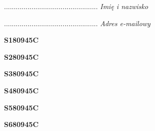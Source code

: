 \begin{turn}{90}\begin{minipage}{\linewidth} \vspace{20mm} ................................................  \textit{Imię i nazwisko}\end{minipage}\end{turn}

\begin{turn}{90}\begin{minipage}{\linewidth} \vspace{20mm} ................................................  \textit{Adres e-mailowy}\end{minipage}\end{turn}

\begin{turn}{90}\huge \begin{minipage}{\linewidth} \vspace{10mm}\textbf{S180945C}\end{minipage}\end{turn}

\begin{turn}{90}\huge \begin{minipage}{\linewidth} \vspace{10mm}\textbf{S280945C}\end{minipage}\end{turn}

\begin{turn}{90}\huge \begin{minipage}{\linewidth} \vspace{10mm}\textbf{S380945C}\end{minipage}\end{turn}

\begin{turn}{90}\huge \begin{minipage}{\linewidth} \vspace{10mm}\textbf{S480945C}\end{minipage}\end{turn}

\begin{turn}{90}\huge \begin{minipage}{\linewidth} \vspace{10mm}\textbf{S580945C}\end{minipage}\end{turn}

\begin{turn}{90}\huge \begin{minipage}{\linewidth} \vspace{10mm}\textbf{S680945C}\end{minipage}\end{turn}

